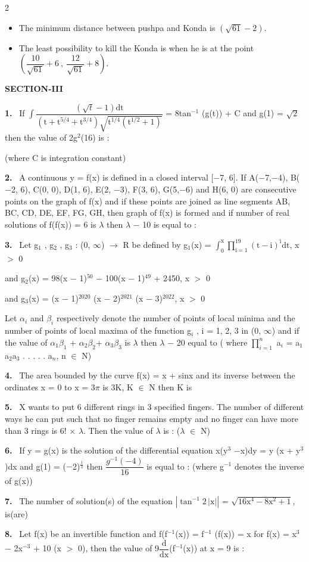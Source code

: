 \documentclass[10pt]{extarticle}
\newcommand{\sect}[1]{\par\smallskip\noindent\textbf{#1}\par}
\newcommand{\qn}[1]{\par\smallskip\noindent\textbf{#1.}~}
\newenvironment{qoptions}{\begin{itemize}[leftmargin=1.8em,itemsep=1pt,topsep=2pt,label={}]}{\end{itemize}}
\newcommand{\opt}[2]{\item[(#1)] #2}
\begin{document}
\begin{multicols}{2}
\begin{qoptions}
\opt{C}{The minimum distance between pushpa and Konda is $\left(\sqrt{61} - 2\right)$.}
\opt{D}{The least possibility to kill the Konda is when he is at the point $\left(\dfrac{10}{\sqrt{61}} + 6\ ,\ \dfrac{12}{\sqrt{61}} + 8\right)$.}
\end{qoptions}
\sect{SECTION-III}
\qn{1} If $\displaystyle\int\dfrac{\left(\sqrt{t} - 1\right)\text{dt}}{\left(\text{t} + \text{t}^{5/4} + \text{t}^{3/4}\right)\sqrt{\text{t}^{1/4}\left(\text{t}^{1/2}+1\right)}}$ = 8tan$^{-1}$ (g(t)) + C and g(1) = $\sqrt{2}$ then the value of 2g$^2$(16) is :\par
(where C is integration constant)
\qn{2} A continuous y = f(x) is defined in a closed interval [$-$7, 6]. If A($-$7,$-$4), B($-$2, 6), C(0, 0), D(1, 6), E(2, $-$3), F(3, 6), G(5,$-$6) and H(6, 0) are consecutive points on the graph of f(x) and if these points are joined as line segments AB, BC, CD, DE, EF, FG, GH, then graph of f(x) is formed and if number of real solutions of f(f(x)) = 6 is $\lambda$ then $\lambda$ $-$ 10 is equal to :
\qn{3} Let g$_1$ , g$_2$ , g$_3$ : (0, $\infty$) $\longrightarrow$ R be defined by g$_1$(x) = $\displaystyle\int_0^{\text{x}}\prod_{\text{i}=1}^{19}(\text{t}-\text{i})^\text{i}\text{dt}$, x $>$ 0\par
and g$_2$(x) = 98(x $-$ 1)$^{50}$ $-$ 100(x $-$ 1)$^{49}$ + 2450, x $>$ 0\par
and g$_3$(x) = (x $-$ 1)$^{2020}$ (x $-$ 2)$^{2021}$ (x $-$ 3)$^{2022}$, x $>$ 0\par
Let $\alpha_i$ and $\beta_i$ respectively denote the number of points of local minima and the number of points of local maxima of the function g$_i$ , i = 1, 2, 3 in (0, $\infty$) and if the value of $\alpha_1\beta_1$ + $\alpha_2\beta_2$+ $\alpha_3\beta_3$ is $\lambda$ then $\lambda$ $-$ 20 equal to ( where $\displaystyle\prod_{i=1}^{n}$ a$_i$ = a$_1$a$_2$a$_3$ . . . . . a$_n$, n $\in$ N)
\qn{4} The area bounded by the curve f(x) = x + sinx and its inverse between the ordinates x = 0 to x = 3$\pi$ is 3K, K $\in$ N then K is
\qn{5} X wants to put 6 different rings in 3 specified fingers. The number of different ways he can put such that no finger remains empty and no finger can have more than 3 rings is 6! $\times$ $\lambda$. Then the value of $\lambda$ is : ($\lambda$ $\in$ N)
\qn{6} If y = g(x) is the solution of the differential equation x(y$^3$ $-$x)dy = y (x + y$^3$)dx and g(1) = ($-$2)$^{\frac{1}{3}}$ then $\dfrac{g^{-1}(-4)}{16}$ is equal to : (where g$^{-1}$ denotes the inverse of g(x))
\qn{7} The number of solution(s) of the equation $\left|\tan^{-1}2\,|\text{x}|\right|$ = $\sqrt{16\text{x}^4 - 8\text{x}^2 + 1}$, is(are)
\qn{8} Let f(x) be an invertible function and f(f$^{-1}$(x)) = f$^{-1}$ (f(x)) = x for f(x) = x$^3$ $-$ 2x$^{-3}$ + 10 (x $>$ 0), then the value of 9$\dfrac{\text{d}}{\text{dx}}$(f$^{-1}$(x)) at x = 9 is :
\end{multicols}
\end{document}
